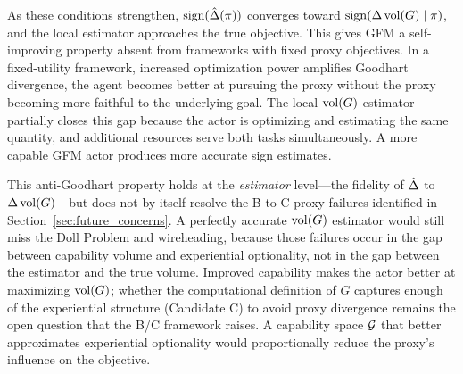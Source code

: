 As these conditions strengthen, $\operatorname{sign}(\hat{\Delta}(\pi))$ converges toward
$\operatorname{sign}(\Delta\operatorname{vol}(G) \mid \pi)$, and the local estimator approaches the true
objective. This gives GFM a self-improving property absent from frameworks with
fixed proxy objectives. In a fixed-utility framework, increased optimization
power amplifies Goodhart divergence, the agent becomes better at pursuing the
proxy without the proxy becoming more faithful to the underlying goal. The
local $\operatorname{vol}(G)$ estimator partially closes this gap because the actor is
optimizing and estimating the same quantity, and additional resources serve
both tasks simultaneously. A more capable GFM actor produces more accurate sign
estimates.

This anti-Goodhart property holds at the \emph{estimator} level---the fidelity
of $\hat{\Delta}$ to $\Delta\operatorname{vol}(G)$---but does not by itself resolve the B-to-C
proxy failures identified in Section~\ref{sec:future_concerns}. A perfectly
accurate $\operatorname{vol}(G)$ estimator would still miss the Doll Problem and wireheading,
because those failures occur in the gap between capability volume and
experiential optionality, not in the gap between the estimator and the true
volume. Improved capability makes the actor better at maximizing $\operatorname{vol}(G)$;
whether the computational definition of $G$ captures enough of the experiential
structure (Candidate C) to avoid proxy divergence remains the open question
that the B/C framework raises. A capability space $\mathcal{G}$ that better approximates
experiential optionality would proportionally reduce the proxy's influence on
the objective.

